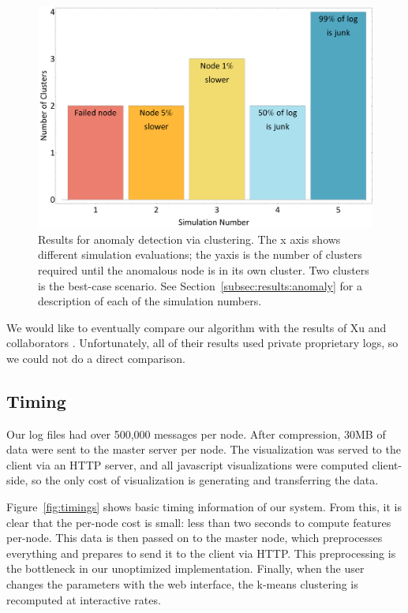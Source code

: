\documentclass[conference]{style/acmsiggraph}
\begin{document}
\begin{figure}[t]
    \centering
    \includegraphics[width=1.0\columnwidth]{images/anomaly.pdf}
    \caption{Results for anomaly detection via clustering. The x axis shows different simulation evaluations; the yaxis is the number of clusters required until the anomalous node is in its own cluster. Two clusters is the best-case scenario. See Section~\ref{subsec:results:anomaly} for a description of each of the simulation numbers.}
    \label{fig:anomaly}
\end{figure}

We would like to eventually compare our algorithm with the results of Xu and collaborators \cite{Xu09}.
Unfortunately, all of their results used private proprietary logs, so we could not do a direct comparison.

\subsection{Timing}
\label{subsec:results:timing}
Our log files had over 500,000 messages per node.
After compression, 30MB of data were sent to the master server per node.
The visualization was served to the client via an HTTP server, and all javascript visualizations were computed client-side, so the only cost of visualization is generating and transferring the data.

Figure~\ref{fig:timings} shows basic timing information of our system.
From this, it is clear that the per-node cost is small: less than two seconds to compute features per-node.
This data is then passed on to the master node, which preprocesses everything and prepares to send it to the client via HTTP.
This preprocessing is the bottleneck in our unoptimized implementation.
Finally, when the user changes the parameters with the web interface, the k-means clustering is recomputed at interactive rates.
\end{document}
